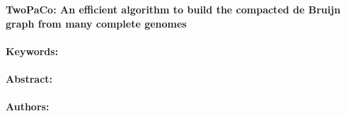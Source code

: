 \noindent
\large {\bf TwoPaCo: An efficient algorithm to build the compacted de Bruijn graph from many complete genomes} 


\normalsize 


\noindent \paragraph{Keywords:} 

\noindent \paragraph{Abstract:} 



\noindent \paragraph{Authors:} 

